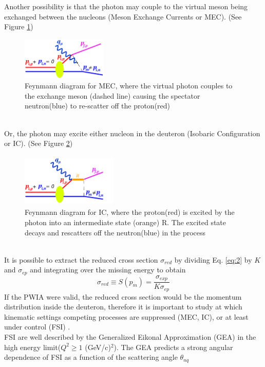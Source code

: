 \documentclass[8pt, twocolumn]{article}
\begin{document}
\indent Another possibility is that the photon may couple to the virtual 
meson being exchanged between the nucleons (Meson Exchange Currents or MEC). (See Figure \ref{fig:Figure4})
\begin{figure}[h]
  \centering
  \includegraphics[width=1.6in, height=0.8in]{MEC.pdf}
  \caption{Feynmann diagram for MEC, where the virtual photon couples to the
exchange meson (dashed line) causing the spectator neutron(blue) to re-scatter off 
the proton(red)}
  \label{fig:Figure4}
\end{figure}\\
\noindent Or, the photon may excite either nucleon in the deuteron (Isobaric Configuration or IC). (See Figure \ref{fig:Figure5}) 
\begin{figure}[h]
  \centering
  \includegraphics[width=1.8in, height=1in]{IC.pdf}
  \caption{Feynmann diagram for IC, where the proton(red) is excited by the photon
into an intermediate state (orange) R. The excited state decays and rescatters off the
neutron(blue) in the process}
  \label{fig:Figure5}
\end{figure} \\
\indent It is possible to extract the reduced cross section $\sigma_{red}$ by dividing Eq. \ref{eq:2} 
by $K$ and $\sigma_{ep}$ and integrating over the missing energy to obtain
\begin{equation} \label{eq:3}
\sigma_{red} \equiv S(p_{m}) = \frac{\sigma_{exp}}{K\sigma_{ep}}
\end{equation}
If the PWIA were valid, the reduced cross section would be the momentum distribution
inside the deuteron, therefore it is important to study at which kinematic
settings competing processes are suppressed (MEC, IC), or at least 
under control (FSI) \cite{boeglin3}.\\
\indent FSI are well described by the Generalized Eikonal Approximation (GEA) in the high energy limit($Q^{2}\geq1$ (GeV/c)$^{2}$).
The GEA predicts a strong angular dependence of FSI as a function of the scattering angle $\theta_{nq}$
\end{document}
